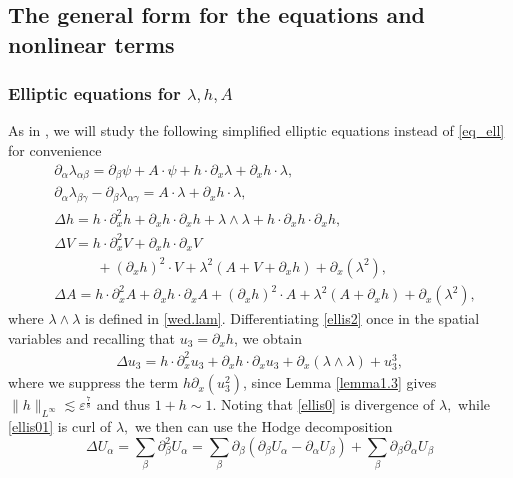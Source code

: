 \documentclass[11pt,letterpaper,reqno]{amsart}
\numberwithin{equation}{section}
\theoremstyle{definition}
\theoremstyle{remark}
\begin{document}
\subsection{The general form for the equations and nonlinear terms}  \label{sec2.3}
\subsubsection{Elliptic equations for $\lambda, h, A$}
As in \cite{HLT24,HT22}, we will study the following simplified elliptic equations instead of \eqref{eq_ell}  for convenience
\begin{align} 
	&\partial_\alpha \lambda_{\alpha \beta}=\partial_\beta \psi+A\cdot \psi+h\cdot \partial_x \lambda+\partial_x h\cdot \lambda,\label{ellis0}\\
    &\partial_\alpha \lambda_{\beta \gamma}-\partial_\beta \lambda_{\alpha \gamma}=A \cdot\lambda+\partial_x h \cdot\lambda,\label{ellis01} \\
	&\Delta h= h \cdot\partial_x^2  h+ \partial_x h\cdot \partial_x h +   \lambda\wedge\lambda+h\cdot\partial_x h\cdot \partial_x h, \label{ellis2}\\
	&\Delta V=  h\cdot \partial_x^2 V+\partial_x h\cdot \partial_x V\label{ellis3}\\
  &\qquad \quad +(\partial_x h)^2\cdot V+\lambda^2(A+V+\partial_x h)+\partial_x (\lambda^2), \nonumber\\
	&\Delta A=  h\cdot \partial_x^2 A+\partial_x h\cdot   \partial_x A+(\partial_x h )^2 \cdot A+\lambda^2(A+\partial_x h)+\partial_x (\lambda^2 ), \label{ellis4} 
\end{align}
where  \(\lambda\wedge\lambda\) is defined in \eqref{wed.lam}. Differentiating \eqref{ellis2} once in the spatial variables and recalling
that \(u_3=\partial_xh\), we obtain
\begin{align}
    \Delta u_3= h\cdot \partial_x^2 u_3+ \partial_x h \cdot\partial_x u_3+\partial_x(\lambda\wedge\lambda)+u_3^3, \label{gen_h}
\end{align}
where  we suppress the term $ h \partial_x   (u_3^2) $, since   Lemma \ref{lemma1.3} gives  \( \|h\|_{L^\infty} \lesssim \varepsilon^{\frac 78} \) and thus \(1+h \sim 1\).
Noting that \eqref{ellis0}  is divergence of $ \lambda, $  while \eqref{ellis01} is curl   of $ \lambda, $ we then can
 use  the Hodge decomposition 
 \[
 \Delta U_\alpha= \sum_\beta \partial_{  \beta}^2 U_\alpha = \sum_\beta \partial_{  \beta} \left( \partial_{  \beta} U_\alpha -\partial_{  \alpha} U_\beta\right)+\sum_\beta \partial_{  \beta} \partial_{  \alpha} U_\beta
 \]
\end{document}
